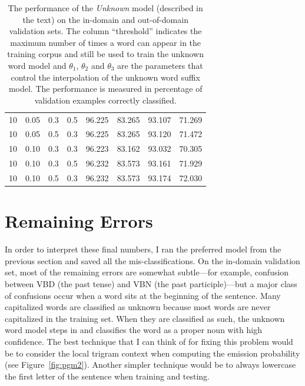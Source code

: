 \documentclass[11pt]{article}
\newcommand{\fig}[1]{Figure~\ref{fig:#1}}
\newcommand{\code}[1]{{\sffamily #1}}
\begin{document}
\begin{table}[phtb]
\begin{center}
\begin{tabular}{c ccc cccc}
10 & 0.05 & 0.3 & 0.5 & 96.225 & 83.265 & 93.107 & 71.269\\
10 & 0.05 & 0.5 & 0.3 & 96.225 & 83.265 & 93.120 & 71.472\\
10 & 0.10 & 0.3 & 0.3 & 96.223 & 83.162 & 93.032 & 70.305\\
10 & 0.10 & 0.3 & 0.5 & 96.232 & 83.573 & 93.161 & 71.929\\
10 & 0.10 & 0.5 & 0.3 & 96.232 & 83.573 & 93.174 & 72.030\\
\bottomrule
\end{tabular}
\end{center}
\caption{%
The performance of the \emph{Unknown} model (described in the text) on the
in-domain and out-of-domain validation sets.
The column ``threshold'' indicates the maximum number of times a word can
appear in the training corpus and still be used to train the unknown word
model and $\theta_1$, $\theta_2$ and $\theta_3$ are the parameters that
control the interpolation of the unknown word suffix model.
The performance is measured in percentage of validation examples correctly
classified.
\label{tab:unknown}}
\end{table}

\section{Remaining Errors}

In order to interpret these final numbers, I ran the preferred model from the
previous section and saved all the mis-classifications.
On the in-domain validation set, most of the remaining errors are somewhat
subtle---for example, confusion between \code{VBD} (the past tense) and
\code{VBN} (the past participle)---but a major class of confusions occur when
a word sits at the beginning of the sentence.
Many capitalized words are classified as unknown because most words are never
capitalized in the training set.
When they are classified as such, the unknown word model steps in and
classifies the word as a proper noun with high confidence.
The best technique that I can think of for fixing this problem would be to
consider the local trigram context when computing the emission probability
(see \fig{pgm2}).
Another simpler technique would be to always lowercase the first letter of the
sentence when training and testing.
\end{document}
